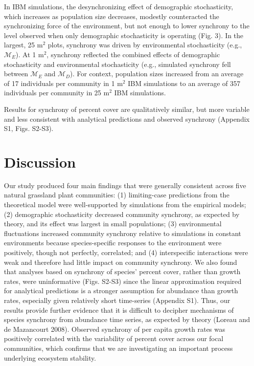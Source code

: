 \documentclass[12pt,]{article}
\begin{document}
In IBM simulations, the desynchronizing effect of demographic
stochasticity, which increases as population size decreases, modestly
counteracted the synchronizing force of the environment, but not enough
to lower synchrony to the level observed when only demographic
stochasticity is operating (Fig. 3). In the largest, 25 \(\text{m}^2\)
plots, synchrony was driven by environmental stochasticity (e.g.,
\(\mathcal{M}_E\)). At 1 \(\text{m}^2\), synchrony reflected
the combined effects of demographic stochasticity and
environmental stochasticity (e.g.,
simulated synchrony fell between \(\mathcal{M}_E\) and
\(\mathcal{M}_D\)). For context, population sizes increased from an
average of 17 individuals per community in 1 \(\text{m}^2\) IBM
simulations to an average of 357 individuals per community in 25
\(\text{m}^2\) IBM simulations.

Results for synchrony of percent cover are qualitatively similar, but
more variable and less consistent with analytical predictions and
observed synchrony (Appendix S1, Figs. S2-S3).

\section{Discussion}

Our study produced four main findings that were generally consistent
across five natural grassland plant communities: (1) limiting-case predictions
from the theoretical model were well-supported by simulations from the
empirical models; (2) demographic stochasticity decreased community
synchrony, as expected by theory, and its effect was largest in small
populations; (3) environmental fluctuations increased community
synchrony relative to simulations in constant environments because
species-specific responses to the environment were positively, though
not perfectly, correlated; and (4) interspecific interactions were weak
and therefore had little impact on community synchrony. We also found
that analyses based on synchrony of species' percent cover, rather than
growth rates, were uninformative (Figs. S2-S3) since the linear
approximation required for analytical predictions is a stronger
assumption for abundance than growth rates, especially given relatively
short time-series (Appendix S1). Thus, our results provide further
evidence that it is difficult to decipher mechanisms of species
synchrony from abundance time series, as expected by theory (Loreau and
{{de Mazancourt}} 2008). Observed synchrony of per capita growth rates
was positively correlated with the variability of percent cover across
our focal communities, which confirms that we are investigating an
important process underlying ecosystem stability.
\end{document}
